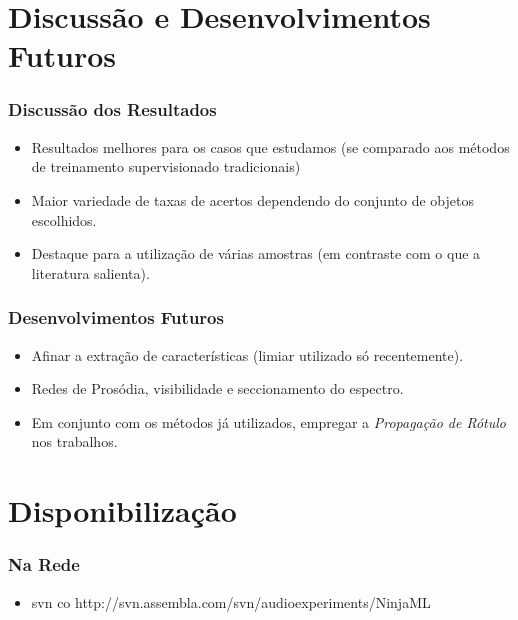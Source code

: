 \documentclass{beamer}
\begin{document}
  \section{Discussão e Desenvolvimentos Futuros}
    \frame{\tableofcontents[current]}
    \frame
    {
      \frametitle{Discussão dos Resultados}
      \begin{itemize}
        \item Resultados melhores para os casos que estudamos (se comparado aos métodos de treinamento supervisionado tradicionais)
        \item Maior variedade de taxas de acertos dependendo do conjunto de objetos escolhidos.
        \item Destaque para a utilização de várias amostras (em contraste com o que a literatura salienta).
      \end{itemize}
    }

    \frame
    {
      \frametitle{Desenvolvimentos Futuros}
      \begin{itemize}
        \item Afinar a extração de características (limiar utilizado só recentemente).
        \item Redes de Prosódia, visibilidade e seccionamento do espectro.
        \item Em conjunto com os métodos já utilizados, empregar a \emph{Propagação de Rótulo} nos trabalhos.
      \end{itemize}
    }

  \section{Disponibilização}
    \frame{\tableofcontents[current]}
    \frame
    {
      \frametitle{Na Rede}
      \begin{itemize}
        \item svn co http://svn.assembla.com/svn/audioexperiments/NinjaML
      \end{itemize}
    }
\end{document}
